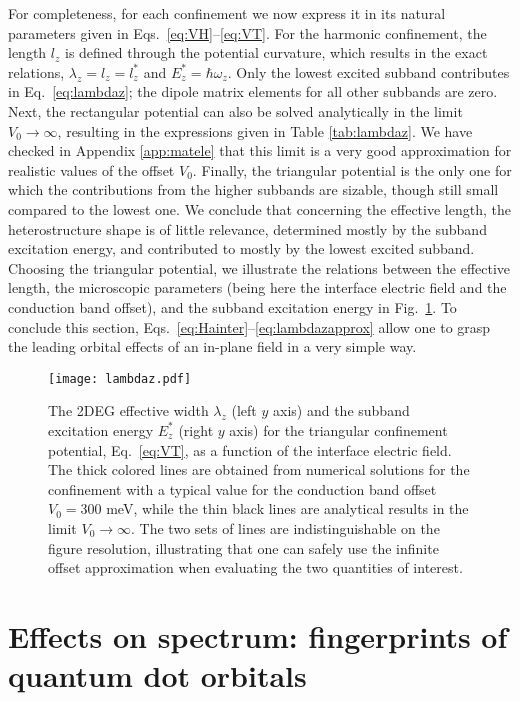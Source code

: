 \documentclass[aps,floatfix,twocolumn,showpacs,10pt,nofootinbib]{revtex4-1}
\begin{document}
For completeness, for each confinement we now express it in its natural parameters given in Eqs.~\eqref{eq:VH}--\eqref{eq:VT}. For the harmonic confinement, the length $l_z$ is defined through the potential curvature, which results in the exact relations, $\lambda_z=l_z=l_z^*$ and $E^*_z=\hbar \omega_z$. Only the lowest excited subband contributes in Eq.~\eqref{eq:lambdaz}; the dipole matrix elements for all other subbands are zero. Next, the rectangular potential can also be solved analytically in the limit $V_0 \to \infty$, resulting in the expressions given in Table \ref{tab:lambdaz}. We have checked in Appendix \ref{app:matele} that this limit is a very good approximation for realistic values of the offset $V_0$. Finally, the triangular potential is the only one for which the contributions from the higher subbands are sizable, though still small compared to the lowest one. We conclude that concerning the effective length, the heterostructure shape is of little relevance, determined mostly by the subband excitation energy, and contributed to mostly by the lowest excited subband. Choosing the triangular potential, we illustrate the relations between the effective length, the microscopic parameters (being here the interface electric field and the conduction band offset), and the subband excitation energy in Fig.~\ref{fig:lambdaz}. To conclude this section, Eqs.~\eqref{eq:Hainter}--\eqref{eq:lambdazapprox} allow one to grasp the leading orbital effects of an in-plane field in a very simple way.


\begin{figure}
\texttt{[image: lambdaz.pdf]}
\caption{\label{fig:lambdaz}
The 2DEG effective width $\lambda_z$ (left $y$ axis) and the subband excitation energy $E_z^*$ (right $y$ axis) for the triangular confinement potential, Eq.~\eqref{eq:VT}, as a function of the interface electric field. The thick colored lines are obtained from numerical solutions for the confinement with a typical value for the conduction band offset $V_0=300$ meV, while the thin black lines are analytical results in the limit $V_0 \to \infty$. The two sets of lines are indistinguishable on the figure resolution, illustrating that one can safely use the infinite offset approximation when evaluating the two quantities of interest.
}
\end{figure}



\section{Effects on spectrum: fingerprints of quantum dot orbitals}
\end{document}
